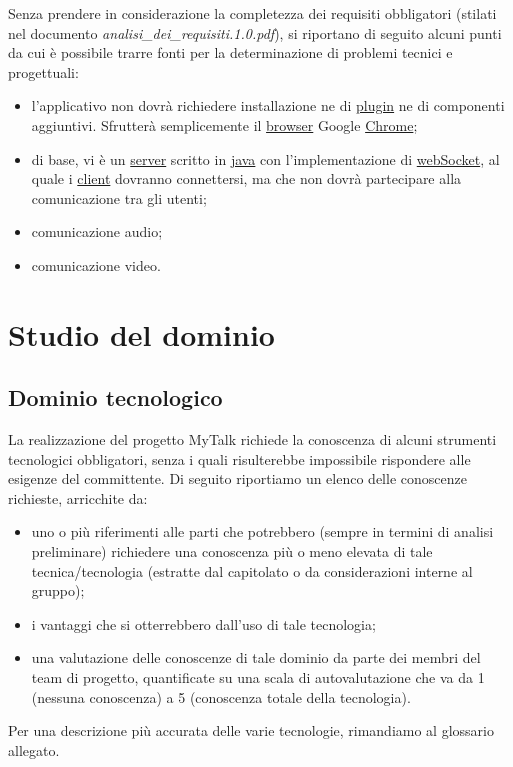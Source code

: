 Senza prendere in considerazione la completezza dei requisiti obbligatori (stilati nel documento \textit{analisi\_dei\_requisiti.1.0.pdf}), si riportano di seguito alcuni punti  da cui è possibile trarre fonti per la determinazione di problemi tecnici e progettuali:

\begin{itemize}
	\item l'applicativo non dovrà richiedere installazione ne di \underline{plugin} ne di componenti aggiuntivi. Sfrutterà semplicemente il \underline{browser} Google \underline{Chrome};
	\item di base, vi è un \underline{server} scritto in \underline{java} con l'implementazione di \underline{webSocket}, al quale i \underline{client} dovranno connettersi, ma che non dovrà partecipare alla comunicazione tra gli utenti;
	\item comunicazione audio;
	\item comunicazione video.
\end{itemize}
\clearpage
\section{Studio del dominio}

\subsection{Dominio tecnologico}
La realizzazione del progetto MyTalk richiede la conoscenza di alcuni strumenti tecnologici obbligatori, senza i quali risulterebbe impossibile rispondere alle esigenze del committente. Di seguito riportiamo un elenco delle conoscenze richieste, arricchite da:

\begin{itemize}
	\item uno o più riferimenti alle parti che potrebbero (sempre in termini di analisi preliminare) richiedere una conoscenza più o meno elevata di tale tecnica/tecnologia (estratte dal capitolato o da considerazioni interne al gruppo);
	\item i vantaggi che si otterrebbero dall'uso di tale tecnologia;
	\item una valutazione delle conoscenze di tale dominio da parte dei membri del team di progetto, quantificate su una scala di autovalutazione che va da 1 (nessuna conoscenza) a 5 (conoscenza totale della tecnologia).
\end{itemize}
Per una descrizione più accurata delle varie tecnologie, rimandiamo al glossario allegato.

